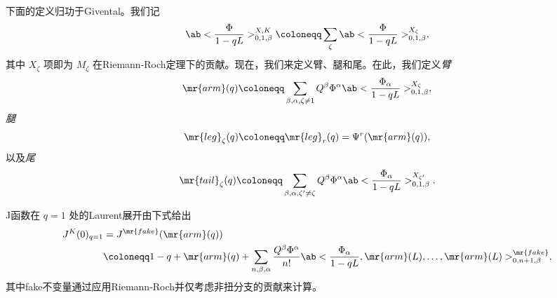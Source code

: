 %
%

下面的定义归功于Givental。我们记
\[ \ab<\frac{\Phi}{1-qL}>_{0,1,\beta}^{X,K} \coloneqq \sum_{\zeta} \ab<\frac{\Phi}{1-qL}>_{0,1,\beta}^{X_{\zeta}}, \]
其中 \(X_{\zeta}\) 项即为 \(M_{\zeta}\) 在Riemann-Roch定理下的贡献。现在，我们来定义臂、腿和尾。在此，我们定义\textit{臂}
\[ \mr{arm}(q) \coloneqq \sum_{\beta, \alpha, \zeta \neq 1} Q^{\beta} \Phi^{\alpha}\ab<\frac{\Phi_{\alpha}}{1-qL}>_{0,1,\beta}^{X_{\zeta}}, \]
\textit{腿}
\[ \mr{leg}_{\zeta}(q) \coloneqq \mr{leg}_r(q) = \Psi^r (\mr{arm}(q)), \]
以及\textit{尾}
\[ \mr{tail}_{\zeta}(q) \coloneqq \sum_{\beta, \alpha, \zeta' \neq \zeta} Q^{\beta} \Phi^{\alpha} \ab<\frac{\Phi_{\alpha}}{1-qL}>_{0,1,\beta}^{X_{\zeta'}}. \]

\begin{prop}
    J函数在 \(q = 1\) 处的Laurent展开由下式给出
    \begin{align*}
        J^K(0)_{q=1} &= J^{\mr{fake}}(\mr{arm}(q)) \\
        &\coloneqq 1-q + \mr{arm}(q) + \sum_{n,\beta,\alpha} \frac{Q^{\beta}\Phi^{\alpha}}{n!} \ab<\frac{\Phi_{\alpha}}{1-qL}, \mr{arm}(L), \ldots, \mr{arm}(L)>_{0,n+1,\beta}^{\mr{fake}},
    \end{align*}
    其中fake不变量通过应用Riemann-Roch并仅考虑非扭分支的贡献来计算。
\end{prop}

